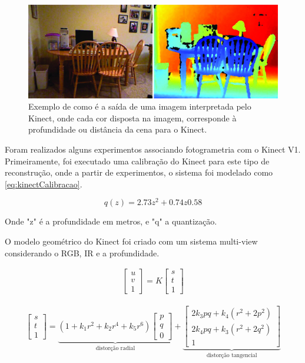 \begin{figure}[!h]
	\centering
	\includegraphics[width=1\linewidth]{figs/profundidadekinect.png}
	\caption{%
	Exemplo de como é a saída de uma imagem interpretada pelo Kinect, onde cada cor disposta na imagem, corresponde à profundidade ou distância da cena para o Kinect.
	}\label{fig:profKinect}
\end{figure}
 
Foram realizados alguns experimentos associando fotogrametria com o Kinect V1. Primeiramente, foi executado uma calibração do Kinect para este tipo de reconstrução, onde a partir de experimentos, o sistema foi modelado como \ref{eq:kinectCalibracao}.

\begin{equation}
\label{eq:kinectCalibracao}
q(z)=2.73z^{2}+0.74z 0.58
\end{equation}

Onde "z" é a profundidade em metros, e "q" a quantização.

O modelo geométrico do Kinect foi criado com um sistema multi-view considerando o RGB, IR e a profundidade.

\begin{gather} 
\label{eq:matrix}
\begin{bmatrix}
u\\
v\\
1
\end{bmatrix} 
= K
\begin{bmatrix}
s\\
t\\
1
\end{bmatrix}
\end{gather}

\begin{gather} 
\begin{bmatrix}
s\\
t\\
1
\end{bmatrix} 
= 
\underbrace{(1 + k_1r^2 + k_2r^4 + k_5r^6) 
\begin{bmatrix}
p\\
q\\
0
\end{bmatrix} }_{\text{distorção radial}} 
+
\underbrace{
\begin{bmatrix}
2k_3pq+k_4(r^2+2p^2)\\
2k_4pq+k_3(r^2+2q^2)\\
1
\end{bmatrix} }_{\text{distorção tangencial}}
\label{eq:distorcaoKinect}
\end{gather}

